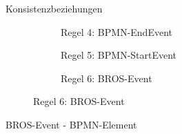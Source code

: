 \begin{frame}{Konsistenzbeziehungen}
\begin{figure}
\begin{subfigure}{0.3\textwidth}
      \centering
      \begin{adjustbox}{width=0.8\linewidth,center}
      \end{adjustbox}
      \caption*{\tiny{\textcolor{black!20}{Regel 4: BPMN-EndEvent}}}%
    \end{subfigure}
    \hfill
    \begin{subfigure}{0.3\textwidth}
      \vspace{4pt}
      \centering
      \begin{adjustbox}{width=0.8\linewidth,center}
      \end{adjustbox}
      \caption*{\tiny{\textcolor{black!20}{Regel 5: BPMN-StartEvent}}}%
    \end{subfigure}
    \hfill
    \begin{subfigure}{0.3\textwidth}
      \vspace{4pt}
      \centering
      \begin{adjustbox}{width=0.8\linewidth,center}
      \end{adjustbox}
      \caption*{\tiny{Regel 6: BROS-Event}}%
    \end{subfigure}
  \end{figure}
\end{frame}

\begin{frame}{BROS-Event - BPMN-Element}
    \begin{figure}
      \centering
      \begin{adjustbox}{width=0.5\linewidth,center}
        
      \end{adjustbox}
    \end{figure}
\end{frame}

